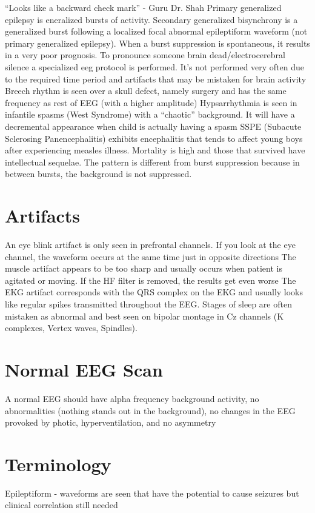 \documentclass[12pt]{article}
\begin{document}
“Looks like a backward check mark” - Guru Dr. Shah
\medskip
Primary generalized epilepsy is eneralized bursts of activity. Secondary generalized bisynchrony is a generalized burst following a localized focal abnormal epileptiform waveform (not primary generalized epilepsy).
\medskip
When a burst suppression is spontaneous, it results in a very poor prognosis.
\medskip
To pronounce someone brain dead/electrocerebral silence a specialized eeg protocol is performed. It's not performed very often due to the required time period and artifacts that may be mistaken for brain activity
\medskip
Breech rhythm is seen over a skull defect, namely surgery and has the same frequency as rest of EEG (with a higher amplitude)
\medskip
Hypsarrhythmia is seen in infantile spasms (West Syndrome) with a “chaotic” background. It will have a decremental appearance when child is actually having a spasm 
\medskip
SSPE (Subacute Sclerosing Panencephalitis) exhibits encephalitis that tends to affect young boys after experiencing measles illness. Mortality is high and those that survived have intellectual sequelae. The pattern is different from burst suppression because in between bursts, the background is not suppressed.

\section{Artifacts}
An eye blink artifact is only seen in prefrontal channels. If you look at the eye channel, the waveform occurs at the same time just in opposite directions
\medskip
The muscle artifact appears to be too sharp and usually occurs when patient is agitated or moving. If the HF filter is removed, the results get even worse
\medskip
The EKG artifact corresponds with the QRS complex on the EKG and usually looks like regular spikes transmitted throughout the EEG.
\medskip
Stages of sleep are often mistaken as abnormal and best seen on bipolar montage in Cz channels (K complexes, Vertex waves, Spindles).

\section{Normal EEG Scan}
A normal EEG should have alpha frequency background activity, no abnormalities (nothing stands out in the background), no changes in the EEG provoked by photic, hyperventilation, and no asymmetry  

\section{Terminology} 
	Epileptiform - waveforms are seen that have the potential to cause seizures but clinical correlation still needed
\medskip
\end{document}
